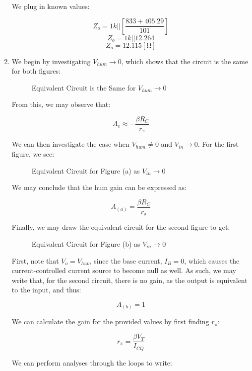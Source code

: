 \begin{enumerate}
    We plug in known values:

    $$Z_o=1k||\left[ \frac{833+405.29}{101} \right]$$
    $$Z_o=1k||12.264$$
    $$\boxed{Z_o=12.115[\si{\ohm}]}$$

  \item

    We begin by investigating $V_{hum}\to 0$, which shows that the circuit is the same for both figures:

    \begin{figure}[H]
      \centering
      
      \caption{Equivalent Circuit is the Same for $V_{hum}\to0$}
      \label{fig:3}
    \end{figure}

    From this, we may observe that:

    $$\boxed{A_v\approx -\frac{\beta R_C}{r_{\pi}}}$$

    We can then investigate the case when $V_{hum}\neq 0$ and $V_{in}\to0$. For the first figure, we see:

    \begin{figure}[H]
      \centering
      
      \caption{Equivalent Circuit for Figure (a) as $V_{in}\to0$}
      \label{fig:4}
    \end{figure}

    We may conclude that the hum gain can be expressed as:

    $$\boxed{A_{(a)}=\frac{\beta R_C}{r_{\pi}}}$$

    Finally, we may draw the equivalent circuit for the second figure to get:

    \begin{figure}[H]
      \centering
      
      \caption{Equivalent Circuit for Figure (b) as $V_{in}\to0$}
      \label{fig:5}
    \end{figure}

    First, note that $V_{o}=V_{hum}$ since the base current, $I_B=0$, which causes the current-controlled current source to become null as well. As such, we may write that, for the second circuit, there is no gain, as the output is equivalent to the input, and thus:

    $$\boxed{A_{(b)}=1}$$

    We can calculate the gain for the provided values by first finding $r_{\pi}$:

    $$r_{\pi}=\frac{\beta V_T}{I_{CQ}}$$

    We can perform analyses through the loops to write:


\end{enumerate}
